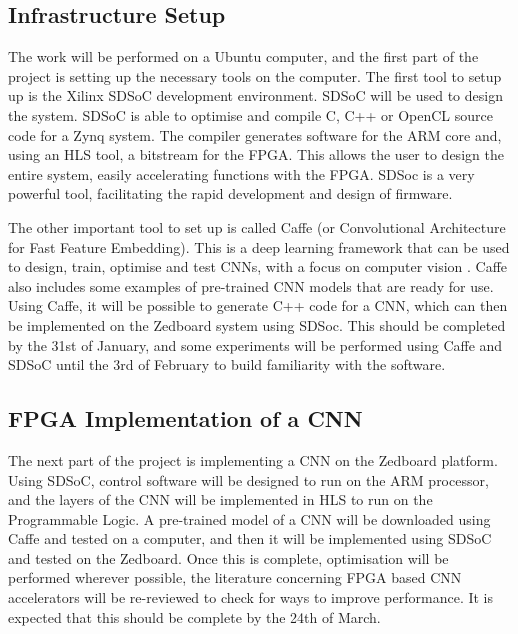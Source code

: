 \documentclass[12pt]{article}
\begin{document}
\subsection{Infrastructure Setup}
\label{sec:ImpPlan-InfSetup}
\vspace{-12pt}

The work will be performed on a Ubuntu computer, and the first part of the project is setting up the necessary tools on the computer. The first tool to setup up is the Xilinx SDSoC development environment. SDSoC will be used to design the system. SDSoC is able to optimise and compile C, C++ or OpenCL source code for a Zynq system. The compiler generates software for the ARM core and, using an HLS tool, a bitstream for the FPGA. This allows the user to design the entire system, easily accelerating functions with the FPGA. SDSoc is a very powerful tool, facilitating the rapid development and design of firmware.

The other important tool to set up is called Caffe (or Convolutional Architecture for Fast Feature Embedding). This is a deep learning framework that can be used to design, train, optimise and test CNNs, with a focus on computer vision \cite{jia2014caffe}. Caffe also includes some examples of pre-trained CNN models that are ready for use. Using Caffe, it will be possible to generate C++ code for a CNN, which can then be implemented on the Zedboard system using SDSoc. This should be completed by the 31st of January, and some experiments will be performed using Caffe and SDSoC until the 3rd of February to build familiarity with the software.

\subsection{FPGA Implementation of a CNN}
\label{sec:ImpPlan-FPGAImplOfCnn}
\vspace{-12pt}

The next part of the project is implementing a CNN on the Zedboard platform. Using SDSoC, control software will be designed to run on the ARM processor, and the layers of the CNN will be implemented in HLS to run on the Programmable Logic. A pre-trained model of a CNN will be downloaded using Caffe and tested  on a computer, and then it will be implemented using SDSoC and tested on the Zedboard. Once this is complete, optimisation will be performed wherever possible, the literature concerning FPGA based CNN accelerators will be re-reviewed to check for ways to improve performance. It is expected that this should be complete by the 24th of March.
\end{document}
